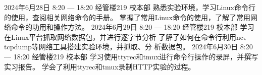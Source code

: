 \documentclass{swfulabjournal}
\begin{document}
\maketitle %

\addjournal%
{%
  2024年6月28日}%
{%
  8:20 --- 18:20}%
{%
  经管楼219}%
{%
  校本部}%
{%
  熟悉实验环境，学习Linux命令行的使用，查阅相关网络命令的手册。}%
{%
  掌握了常用Linux命令的使用，了解了常用网络命令的功用和操作方法。}%
\clearpage
\addjournal%
{%
  2024年6月29日}%
{%
  8:20 --- 18:20}%
{%
  经管楼219}%
{%
  校本部}%
{%
  学习在Linux平台抓取网络数据包，并进行逐字节分析}%
{%
  了解了如何在命令行利用nc、tcpdump等网络工具搭建实验环境，并抓取、分
  析数据包。}%
\clearpage
\addjournal%
{%
  2024年6月30日}%
{%
  8:20 --- 18:20}%
{%
  经管楼219}%
{%
  校本部}%
{%
  学习使用ttyrec和tmux进行命令行操作的录屏，并撰写实习报告。}%
{%
  学会了利用ttyrec和tmux录制HTTP实验的过程。}%
\end{document}

